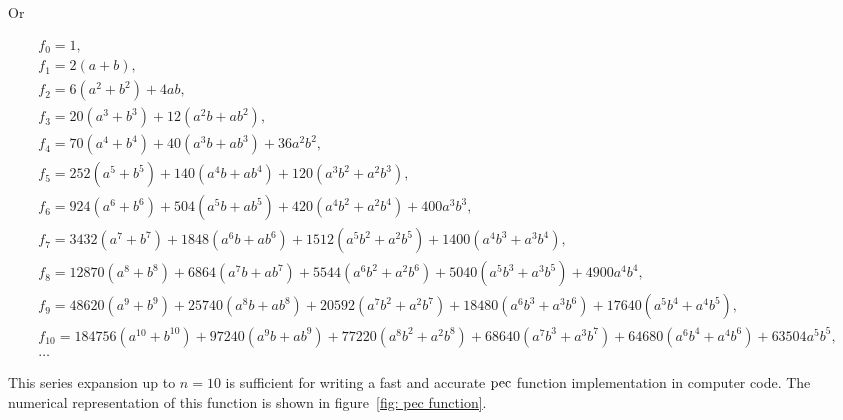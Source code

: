 Or
\begin{footnotesize}
\begin{gather}
    f_0 = 1 , \nonumber \\
    f_1 = 2(a + b) , \nonumber \\
    f_2 = 6(a^2 + b^2) + 4ab , \nonumber \\
    f_3 = 20(a^3 + b^3) + 12(a^2b + ab^2) , \nonumber \\
    f_4 = 70(a^4 + b^4) + 40(a^3b + ab^3) + 36a^2b^2 , \nonumber \\
    f_5 = 252(a^5 + b^5) + 140(a^4b + ab^4) + 120(a^3b^2 + a^2b^3) , \nonumber \\
    f_6 = 924(a^6 + b^6) + 504(a^5b + ab^5) + 420(a^4b^2 + a^2b^4) + 400a^3b^3 , \nonumber \\
    f_7 = 3432(a^7 + b^7) + 1848(a^6b + ab^6) + 1512(a^5b^2 + a^2b^5) + 1400(a^4b^3 + a^3b^4) , \nonumber \\
    f_8 = 12870(a^8 + b^8) + 6864(a^7b + ab^7) + 5544(a^6b^2 + a^2b^6) + 5040(a^5b^3 + a^3b^5) + 4900a^4b^4 , \nonumber \\
    f_9 = 48620(a^9 + b^9) + 25740(a^8b + ab^8) + 20592(a^7b^2 + a^2b^7) + 18480(a^6b^3 + a^3b^6) + 17640(a^5b^4 + a^4b^5) , \nonumber \\
    f_{10} = 184756(a^{10} + b^{10}) + 97240(a^9b + ab^9) + 77220(a^8b^2 + a^2b^8) + 68640(a^7b^3 + a^3b^7) + 64680(a^6b^4 + a^4b^6) + 63504a^5b^5 , \nonumber \\
    \dots
\end{gather}
\end{footnotesize}

This series expansion up to $n = 10$ is sufficient for writing a fast and accurate $\operatorname{pec}$ function implementation in computer code.
The numerical representation of this function is shown in figure~\ref{fig: pec function}.

